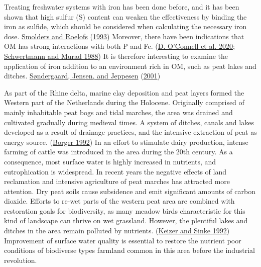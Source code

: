 \documentclass[a4paper,11pt]{article}
\begin{document}
Treating freshwater systems with iron has been done before, and it has been shown that high sulfur (S) content can weaken the effectiveness by binding the iron as sulfide, which should be considered when calculating the necessary iron dose. \protect\hyperlink{ref-smoldersSulphatemediatedIronLimitation1993}{Smolders and Roelofs} (\protect\hyperlink{ref-smoldersSulphatemediatedIronLimitation1993}{1993}) Moreover, there have been indications that OM has strong interactions with both P and Fe. (\protect\hyperlink{ref-oconnellChangesSedimentaryPhosphorus2020}{D. O'Connell et al. 2020}; \protect\hyperlink{ref-schwertmannNatureIronOxide1988}{Schwertmann and Murad 1988}) It is therefore interesting to examine the application of iron addition to an environment rich in OM, such as peat lakes and ditches. \protect\hyperlink{ref-sondergaardRetentionInternalLoading2001}{Søndergaard, Jensen, and Jeppesen} (\protect\hyperlink{ref-sondergaardRetentionInternalLoading2001}{2001})

As part of the Rhine delta, marine clay deposition and peat layers formed the Western part of the Netherlands during the Holocene. Originally comprised of mainly inhabitable peat bogs and tidal marches, the area was drained and cultivated gradually during medieval times. A system of ditches, canals and lakes developed as a result of drainage practices, and the intensive extraction of peat as energy source. (\protect\hyperlink{ref-borgerDrainingDiggingDredging1992}{Borger 1992}) In an effort to stimulate dairy production, intense farming of cattle was introduced in the area during the 20th century. As a consequence, most surface water is highly increased in nutrients, and eutrophication is widespread. In recent years the negative effects of land reclamation and intensive agriculture of peat marches has attracted more attention. Dry peat soils cause subsidence and emit significant amounts of carbon dioxide. Efforts to re-wet parts of the western peat area are combined with restoration goals for biodiversity, as many meadow birds characteristic for this kind of landscape can thrive on wet grassland. However, the plentiful lakes and ditches in the area remain polluted by nutrients. (\protect\hyperlink{ref-keizerPhosphorusSedimentLoosdrecht1992}{Keizer and Sinke 1992}) Improvement of surface water quality is essential to restore the nutrient poor conditions of biodiverse types farmland common in this area before the industrial revolution.
\end{document}
